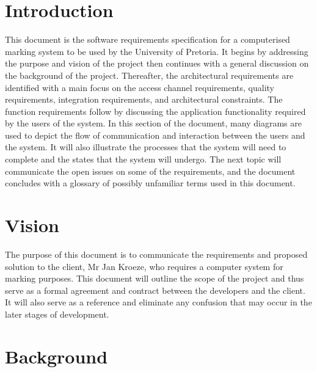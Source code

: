 \documentclass[12pt]{article}
\begin{document}
	\newpage
	\tableofcontents
	
	\newpage
	\section{Introduction}
	
		\vspace{0.2in}
	
				 This document is the software requirements specification for a computerised marking system to be used by the University of Pretoria. It begins by addressing the purpose and vision of the project then continues with a general discussion on the background of the project. Thereafter, the architectural requirements are identified with a main focus on the access channel requirements, quality requirements, integration requirements, and architectural constraints. The function requirements follow by discussing the application functionality required by the users of the system.  In this section of the document, many diagrams are used to depict the flow of communication and interaction between the users and the system. It will also illustrate the processes that the system will need to complete and the states that the system will undergo.  The next topic will communicate the open issues on some of the requirements, and the document concludes with a glossary of possibly unfamiliar terms used in this document.
		
		 
	
	\section{Vision}
	
		\vspace{0.2in}
		
			 		 The purpose of this document is to communicate the requirements and proposed solution to the client, Mr Jan Kroeze, who requires a computer system for marking purposes. This document will outline the scope of the project and thus serve as a formal agreement and contract between the developers and the client. It will also serve as a reference and eliminate any confusion that may occur in the later stages of development.
				
		
	
	\section{Background}
	
\end{document}
